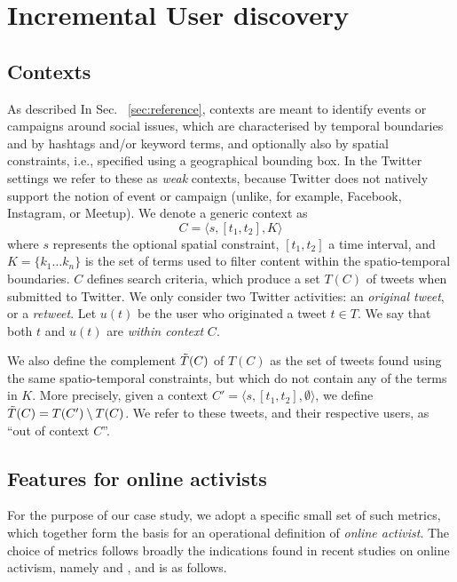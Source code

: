\documentclass[runningheads]{llncs}
\begin{document}
\section{Incremental User discovery}

\subsection{Contexts} \label{sec:contexts}

As described In Sec. ~\ref{sec:reference}, contexts are meant to identify events or campaigns around social issues, which are characterised by temporal boundaries and by hashtags and/or keyword terms, and optionally also by spatial constraints, i.e., specified using a geographical bounding box.
In the Twitter settings we refer to these as \textit{weak} contexts, because Twitter does not natively support the notion of event or campaign (unlike, for example, Facebook, Instagram, or Meetup).
We  denote a generic context as
\begin{equation}
C = \langle s, [t_1, t_2], K \rangle 
\label{eq:context}
\end{equation}
where  $s$ represents the optional spatial constraint, $[t_1, t_2]$ a time interval, and $K = \{ k_1 \dots k_n\}$ is the set of terms used to filter content within the spatio-temporal boundaries.
%
$C$ defines search criteria, which produce a set $T(C)$ of tweets when submitted to Twitter.
We only consider two Twitter activities: an \textit{original tweet}, or a \textit{retweet}.
Let $u(t)$ be the user who originated a tweet $t \in T$.
We say that both $t$ and  $u(t)$ are \textit{within context} $C$.

We also define the complement $\Tilde{T}(C)$ of $T(C)$ as the set of tweets found using the same spatio-temporal constraints, but which do not contain any of the terms in $K$. More precisely, given a  context $C'= \langle s, [t_1, t_2], \emptyset \rangle$, we define $\Tilde{T}(C) = T(C') \setminus T(C)$. 
We refer to these tweets, and their respective users, as ``out of context $C$''.



\subsection{Features  for online activists}

For the purpose of our case study, we adopt a specific small set of such metrics, which together form   the basis for an operational definition of \textit{online activist}.
The choice of metrics follows broadly the indications found in recent studies on online activism, namely \cite{Lotan2011} and  \cite{Poell2014}, and is as follows.
\end{document}
